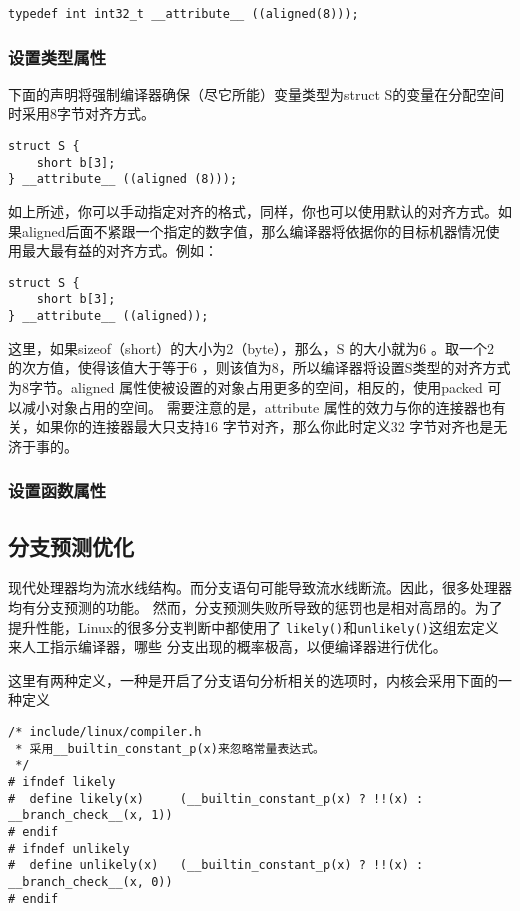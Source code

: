\begin{verbatim}
typedef int int32_t __attribute__ ((aligned(8)));
\end{verbatim}
			\subsubsection{设置类型属性}

				下面的声明将强制编译器确保（尽它所能）变量类型为struct S的变量在分配空间时采用8字节对齐方式。				
\begin{verbatim}
struct S {
	short b[3];
} __attribute__ ((aligned (8)));
\end{verbatim}

			如上所述，你可以手动指定对齐的格式，同样，你也可以使用默认的对齐方式。如果aligned后面不紧跟一个指定的数字值，那么编译器将依据你的目标机器情况使用最大最有益的对齐方式。例如：

\begin{verbatim}
struct S {
	short b[3];
} __attribute__ ((aligned));
\end{verbatim}

			这里，如果sizeof（short）的大小为2（byte），那么，S 的大小就为6 。取一个2 的次方值，使得该值大于等于6 ，则该值为8，所以编译器将设置S类型的对齐方式为8字节。aligned 属性使被设置的对象占用更多的空间，相反的，使用packed 可以减小对象占用的空间。
			需要注意的是，attribute 属性的效力与你的连接器也有关，如果你的连接器最大只支持16 字节对齐，那么你此时定义32 字节对齐也是无济于事的。

			\subsubsection{设置函数属性}
	\subsection{分支预测优化}

		现代处理器均为流水线结构。而分支语句可能导致流水线断流。因此，很多处理器均有分支预测的功能。
然而，分支预测失败所导致的惩罚也是相对高昂的。为了提升性能，Linux的很多分支判断中都使用了
\texttt{likely()}和\texttt{unlikely()}这组宏定义来人工指示编译器，哪些
分支出现的概率极高，以便编译器进行优化。

		这里有两种定义，一种是开启了分支语句分析相关的选项时，内核会采用下面的一种定义
\begin{verbatim}
/* include/linux/compiler.h
 * 采用__builtin_constant_p(x)来忽略常量表达式。
 */
# ifndef likely
#  define likely(x)     (__builtin_constant_p(x) ? !!(x) : __branch_check__(x, 1))
# endif
# ifndef unlikely
#  define unlikely(x)   (__builtin_constant_p(x) ? !!(x) : __branch_check__(x, 0))
# endif
\end{verbatim}

